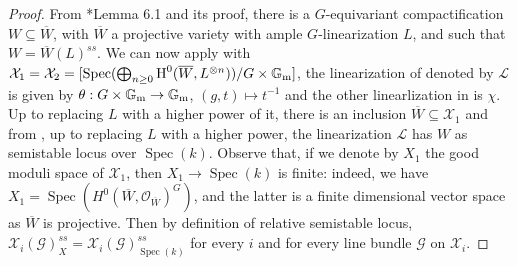 \documentclass{amsart}
\newcommand{\bG}{\mathbb{G}}
\newcommand{\oH}{\operatorname{H}}
\newcommand{\cG}{\mathcal{G}}
\newcommand{\cL}{\mathcal{L}}
\newcommand{\cO}{\mathcal{O}}
\newcommand{\cX}{\mathcal{X}}
\newcommand{\spec}{\operatorname{Spec}}
\newcommand{\Gm}{\bG_{{\rm m}}}
\theoremstyle{definition}
\theoremstyle{definition}
\begin{document}
{\begin{proof}
    From \cite{teleman2000quantization}*{Lemma 6.1} and its proof, there is a $G$-equivariant compactification $W\subseteq \overline{W}$, with $\overline{W}$ a projective variety with ample $G$-linearization $L$, and such that $W=\overline{W}(L)^{ss}$. We can now apply 
    with $\cX_1=\cX_2=[\spec(\bigoplus_{n\ge 0}\oH^0(\overline{W}, L^{\otimes n}))/G\times \Gm]$, the linearization of  denoted by $\cL$ is given by $\theta:G\times \Gm\to \Gm$, $(g,t)\mapsto t^{-1}$ and the other linearlization in  is $\chi$.
    Up to replacing $L$ with a higher power of it, there is an inclusion $\overline{W}\subseteq \cX_1$ and from , up to replacing $L$ with a higher power, the linearization $\cL$ has $W$ as semistable locus over $\spec(k)$. Observe that, if we denote by $X_1$ the good moduli space of $\cX_1$, then $X_1\to \spec(k)$ is finite: indeed, we have $X_1=\spec(H^0(\overline{W},\cO_{\overline{W}})^G)$,  and the latter is a finite dimensional vector space as $\overline{W}$ is projective. Then by definition of relative semistable locus, $\cX_i(\cG)^{ss}_X = \cX_i(\cG)^{ss}_{\spec(k)}$ for every $i$ and for every line bundle $\cG$ on $\cX_i$.
    

\end{proof}}
\end{document}
